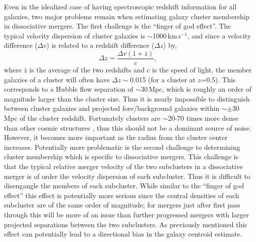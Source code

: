 Even in the idealized case of having spectroscopic redshift information for all galaxies, two major problems remain when estimating galaxy cluster membership in dissociative mergers.
The first challenge is the ``finger of god effect''.
The typical velocity dispersion of cluster galaxies is $\sim$1000\,km\,s$^{-1}$, and since a velocity difference ($\Delta v$) is related to a redshift difference ($\Delta z$) by,
\begin{displaymath}
\Delta z = \frac{\Delta v (1+\bar{z})}{c},
\end{displaymath}
where $\bar{z}$ is the average of the two redshifts and $c$ is the speed of light, the member galaxies of a cluster will often have $\Delta z\sim$0.015 (for a cluster at $z$=0.5).
This corresponds to a Hubble flow separation of $\sim$30\,Mpc, which is roughly an order of magnitude larger than the cluster size.
Thus it is nearly impossible to distinguish between cluster galaxies and projected fore/background galaxies within $\sim\pm$30\,Mpc of the cluster redshift.
Fortunately clusters are $\sim$20-70 times more dense than other cosmic structures \citep[e.g. filaments, walls and voids;][]{AragonCalvo:2010cq}, thus this should not be a dominant source of noise.
However, it becomes more important as the radius from the cluster center increases.
Potentially more problematic is the second challenge to determining cluster membership which is specific to dissociative mergers.
This challenge is that the typical relative merger velocity of the two subclusters in a dissociative merger is of order the velocity dispersion of each subcluster.
Thus it is difficult to disengangle the members of each subcluster.
While similar to the ``finger of god effect'' this effect is potentially more serious since the central densities of each subcluster are of the same order of magnitude; for mergers just after first pass through this will be more of an issue than further progressed mergers with larger projected separations between the two subclusters.
As previously mentioned this effect can potentially lead to a directional bias in the galaxy centroid estimate.
 
